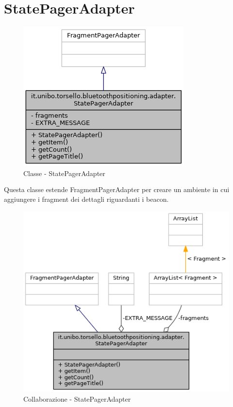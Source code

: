 \newpage
\section{StatePagerAdapter}
\begin{figure}[ph]
	\centering
	\includegraphics[width=0.5\linewidth]{img/uml/class/classit_1_1unibo_1_1torsello_1_1bluetoothpositioning_1_1adapter_1_1StatePagerAdapter__inherit__graph.png}
	\caption{Classe - StatePagerAdapter}
\end{figure}

Questa classe estende FragmentPagerAdapter per creare un ambiente in cui aggiungere i fragment dei dettagli riguardanti i beacon.

\begin{figure}[ph]
	\centering
	\includegraphics[width=0.75\linewidth]{img/uml/class/classit_1_1unibo_1_1torsello_1_1bluetoothpositioning_1_1adapter_1_1StatePagerAdapter__coll__graph.png}
	\caption{Collaborazione - StatePagerAdapter}
\end{figure}

\newpage
